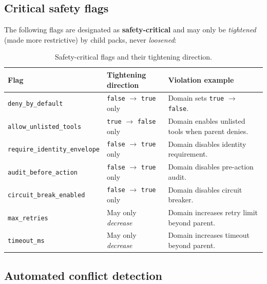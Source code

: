\documentclass[11pt,a4paper,twoside]{report}
\begin{document}
\subsection{Critical safety flags}

The following flags are designated as \textbf{safety-critical} and
may only be \emph{tightened} (made more restrictive) by child packs,
never \emph{loosened}:

\begin{table}[htbp]
\centering
\footnotesize
\caption{Safety-critical flags and their tightening direction.}
\label{tab:safety-flags}
\begin{tabularx}{\textwidth}{@{}l l X@{}}
\toprule
\textbf{Flag} & \textbf{Tightening direction} & \textbf{Violation example} \\
\midrule
\texttt{deny\_by\_default} & \texttt{false} $\rightarrow$ \texttt{true} only & Domain sets \texttt{true} $\rightarrow$ \texttt{false}. \\
\texttt{allow\_unlisted\_tools} & \texttt{true} $\rightarrow$ \texttt{false} only & Domain enables unlisted tools when parent denies. \\
\texttt{require\_identity\_envelope} & \texttt{false} $\rightarrow$ \texttt{true} only & Domain disables identity requirement. \\
\texttt{audit\_before\_action} & \texttt{false} $\rightarrow$ \texttt{true} only & Domain disables pre-action audit. \\
\texttt{circuit\_break\_enabled} & \texttt{false} $\rightarrow$ \texttt{true} only & Domain disables circuit breaker. \\
\texttt{max\_retries} & May only \emph{decrease} & Domain increases retry limit beyond parent. \\
\texttt{timeout\_ms} & May only \emph{decrease} & Domain increases timeout beyond parent. \\
\bottomrule
\end{tabularx}
\end{table}

\subsection{Automated conflict detection}
\end{document}
